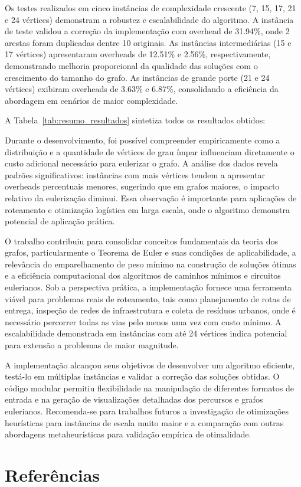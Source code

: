 \documentclass[12pt]{article}
\begin{document}
Os testes realizados em cinco instâncias de complexidade crescente (7, 15, 17, 21 e 24 vértices) demonstram a robustez e escalabilidade do algoritmo. A instância de teste validou a correção da implementação com overhead de 31.94\%, onde 2 arestas foram duplicadas dentre 10 originais. As instâncias intermediárias (15 e 17 vértices) apresentaram overheads de 12.51\% e 2.56\%, respectivamente, demonstrando melhoria proporcional da qualidade das soluções com o crescimento do tamanho do grafo. As instâncias de grande porte (21 e 24 vértices) exibiram overheads de 3.63\% e 6.87\%, consolidando a eficiência da abordagem em cenários de maior complexidade.

A Tabela~\ref{tab:resumo_resultados} sintetiza todos os resultados obtidos:



Durante o desenvolvimento, foi possível compreender empiricamente como a distribuição e a quantidade de vértices de grau ímpar influenciam diretamente o custo adicional necessário para eulerizar o grafo. A análise dos dados revela padrões significativos: instâncias com mais vértices tendem a apresentar overheads percentuais menores, sugerindo que em grafos maiores, o impacto relativo da eulerização diminui. Essa observação é importante para aplicações de roteamento e otimização logística em larga escala, onde o algoritmo demonstra potencial de aplicação prática.

O trabalho contribuiu para consolidar conceitos fundamentais da teoria dos grafos, particularmente o Teorema de Euler e suas condições de aplicabilidade, a relevância do emparelhamento de peso mínimo na construção de soluções ótimas e a eficiência computacional dos algoritmos de caminhos mínimos e circuitos eulerianos. Sob a perspectiva prática, a implementação fornece uma ferramenta viável para problemas reais de roteamento, tais como planejamento de rotas de entrega, inspeção de redes de infraestrutura e coleta de resíduos urbanos, onde é necessário percorrer todas as vias pelo menos uma vez com custo mínimo. A escalabilidade demonstrada em instâncias com até 24 vértices indica potencial para extensão a problemas de maior magnitude.

A implementação alcançou seus objetivos de desenvolver um algoritmo eficiente, testá-lo em múltiplas instâncias e validar a correção das soluções obtidas. O código modular permitiu flexibilidade na manipulação de diferentes formatos de entrada e na geração de visualizações detalhadas dos percursos e grafos eulerianos. Recomenda-se para trabalhos futuros a investigação de otimizações heurísticas para instâncias de escala muito maior e a comparação com outras abordagens metaheurísticas para validação empírica de otimalidade.


\section{Referências}


\end{document}
